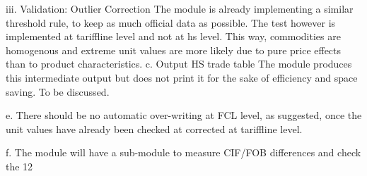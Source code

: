 \documentclass[nojss]{jss}\usepackage[]{graphicx}\usepackage[]{color}
\begin{document}
iii.	Validation: Outlier Correction
The module is already implementing a similar threshold rule, to keep as much official data as possible.
The test however is implemented at tariffline level and not at hs level. This way, commodities are homogenous and extreme unit values are more likely due to pure price effects than to product characteristics.
c.	Output HS trade table
The module produces this intermediate output but does not print it for the sake of efficiency and space saving.
To be discussed.

e.	There should be no automatic over-writing at FCL level, as suggested, once the unit values have already been checked at corrected at tariffline level.

f.	The module will have a sub-module to measure CIF/FOB differences and check the 12%
\end{document}
